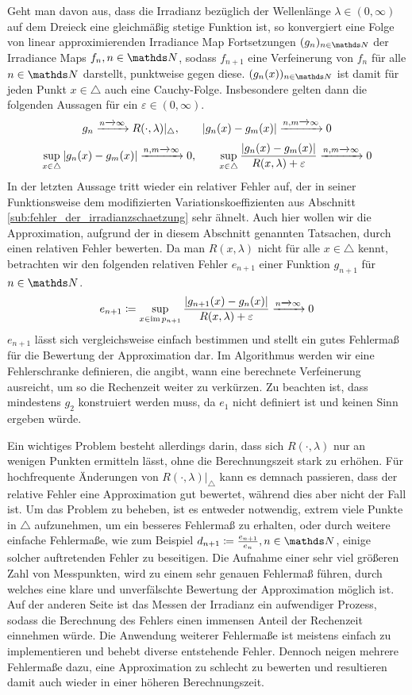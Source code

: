 		Geht man davon aus, dass die Irradianz bezüglich der Wellenlänge $\lambda\in(0,\infty)$ auf dem Dreieck eine gleichmäßig stetige Funktion ist, so konvergiert eine Folge von linear approximierenden Irradiance Map Fortsetzungen $(g_n)_{n\in\SN}$ der Irradiance Maps $f_n,n\in\SN$, sodass $f_{n+1}$ eine Verfeinerung von $f_n$ für alle $n\in\SN$ darstellt, punktweise gegen diese.
		$(g_n(x))_{n\in\SN}$ ist damit für jeden Punkt $x\in\triangle$ auch eine Cauchy-Folge.
		Insbesondere gelten dann die folgenden Aussagen für ein $\varepsilon\in(0,\infty)$.
		\[
			g_n \xrightarrow[]{n\xrightarrow[]{}\infty} R(\cdot,\lambda)\vert_\triangle,\qquad \left\vert g_n(x) - g_m(x) \right\vert \xrightarrow[]{n,m\xrightarrow[]{}\infty} 0
		\]
		\[
			\sup_{x\in\triangle}\left\vert g_n(x) - g_m(x) \right\vert \xrightarrow[]{n,m\xrightarrow[]{}\infty} 0,\qquad
			\sup_{x\in\triangle}\frac{\left\vert g_n(x) - g_m(x) \right\vert}{R(x,\lambda) + \varepsilon} \xrightarrow[]{n,m\xrightarrow[]{}\infty} 0
		\]
		In der letzten Aussage tritt wieder ein relativer Fehler auf, der in seiner Funktionsweise dem modifizierten Variationskoeffizienten aus Abschnitt \ref{sub:fehler_der_irradianzschaetzung} sehr ähnelt.
		Auch hier wollen wir die Approximation, aufgrund der in diesem Abschnitt genannten Tatsachen, durch einen relativen Fehler bewerten.
		Da man $R(x,\lambda)$ nicht für alle $x\in\triangle$ kennt, betrachten wir den folgenden relativen Fehler $e_{n+1}$ einer Funktion $g_{n+1}$ für $n\in\SN$.
		\[
			e_{n+1} \coloneqq \sup_{x\in\operatorname{im} p_{n+1}}\frac{\left\vert g_{n+1}(x) - g_{n}(x) \right\vert}{R(x,\lambda) + \varepsilon} \xrightarrow[]{n\xrightarrow[]{}\infty} 0
		\]
		$e_{n+1}$ lässt sich vergleichsweise einfach bestimmen und stellt ein gutes Fehlermaß für die Bewertung der Approximation dar.
		Im Algorithmus werden wir eine Fehlerschranke definieren, die angibt, wann eine berechnete Verfeinerung ausreicht, um so die Rechenzeit weiter zu verkürzen.
		Zu beachten ist, dass mindestens $g_2$ konstruiert werden muss, da $e_1$ nicht definiert ist und keinen Sinn ergeben würde.

		Ein wichtiges Problem besteht allerdings darin, dass sich $R(\cdot,\lambda)$ nur an wenigen Punkten ermitteln lässt, ohne die Berechnungszeit stark zu erhöhen.
		Für hochfrequente Änderungen von $R(\cdot,\lambda)\vert_\triangle$ kann es demnach passieren, dass der relative Fehler eine Approximation gut bewertet, während dies aber nicht der Fall ist.
		Um das Problem zu beheben, ist es entweder notwendig, extrem viele Punkte in $\triangle$ aufzunehmen, um ein besseres Fehlermaß zu erhalten, oder durch weitere einfache Fehlermaße, wie zum Beispiel $d_{n+1}\define \frac{e_{n+1}}{e_n},n\in\SN$, einige solcher auftretenden Fehler zu beseitigen.
		Die Aufnahme einer sehr viel größeren Zahl von Messpunkten, wird zu einem sehr genauen Fehlermaß führen, durch welches eine klare und unverfälschte Bewertung der Approximation möglich ist.
		Auf der anderen Seite ist das Messen der Irradianz ein aufwendiger Prozess, sodass die Berechnung des Fehlers einen immensen Anteil der Rechenzeit einnehmen würde.
		Die Anwendung weiterer Fehlermaße ist meistens einfach zu implementieren und behebt diverse entstehende Fehler.
		Dennoch neigen mehrere Fehlermaße dazu, eine Approximation zu schlecht zu bewerten und resultieren damit auch wieder in einer höheren Berechnungszeit.


